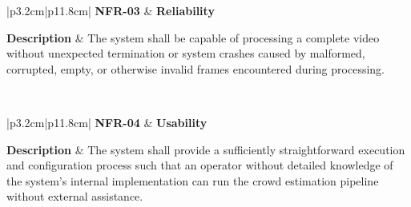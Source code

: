 
\begin{table}[H]
	\centering
	\renewcommand{\arraystretch}{1.25}
	\begin{tabular}{|p{3.2cm}|p{11.8cm}|}
		\hline
		\textbf{NFR-03} &
		\textbf{Reliability} \\ \hline
		
		\textbf{Description} &
		The system shall be capable of processing a complete video without unexpected termination or system crashes caused by malformed, corrupted, empty, or otherwise invalid frames encountered during processing. \\ \hline
		
		 \\ \hline
	\end{tabular}
	\caption{Non-functional requirement for system reliability.}
	\label{tab:nfr03}
\end{table}



\begin{table}[H]
	\centering
	\renewcommand{\arraystretch}{1.25}
	\begin{tabular}{|p{3.2cm}|p{11.8cm}|}
		\hline
		\textbf{NFR-04} &
		\textbf{Usability} \\ \hline
		
		\textbf{Description} &
		The system shall provide a sufficiently straightforward execution and configuration process such that an operator without detailed knowledge of the system's internal implementation can run the crowd estimation pipeline without external assistance. \\ \hline
		
		 \\ \hline
	\end{tabular}
	\caption{Non-functional requirement for system usability.}
	\label{tab:nfr04}
\end{table}


